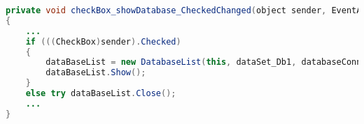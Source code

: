\label{lst:showDb}
\begin{lstlisting}[language=Java, caption=Datenbank anzeigen]
private void checkBox_showDatabase_CheckedChanged(object sender, EventArgs e)
{
	...
	if (((CheckBox)sender).Checked)
	{
		dataBaseList = new DatabaseList(this, dataSet_Db1, databaseConnection, databaseId);
		dataBaseList.Show();
	}
	else try dataBaseList.Close();
	...
}
\end{lstlisting}
